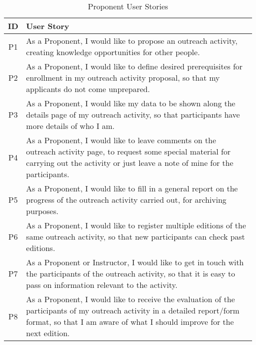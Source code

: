\begin{table}[!htb]
  \centering
  \setlength{\aboverulesep}{0pt}
  \setlength{\belowrulesep}{0pt}
  \caption{Proponent User Stories}
  \label{tab:proponent-user-stories}
  \footnotesize
  \begin{tabularx}{\textwidth}{c|X}
    \toprule
    \rowcolor[rgb]{0.753,0.753,0.753} \textbf{ID} & \textbf{User Story}                    \\
    \hline
    \rowcolor[rgb]{0.898,0.898,0.898} P1          & As a Proponent, I would like to propose an outreach activity, creating knowledge opportunities for other people.                                           \\
    P2                                            & As a Proponent, I would like to define desired prerequisites for enrollment in my outreach activity proposal, so that my applicants do not come unprepared.                                      \\
    \rowcolor[rgb]{0.898,0.898,0.898} P3          & As a Proponent, I would like my data to be shown along the details page of my outreach activity, so that participants have more details of who I am.                                \\
    P4                                            & As a Proponent, I would like to leave comments on the outreach activity page, to request some special material for carrying out the activity or just leave a note of mine for the participants.                              \\
    \rowcolor[rgb]{0.898,0.898,0.898} P5          & As a Proponent, I would like to fill in a general report on the progress of the outreach activity carried out, for archiving purposes.                                \\
    P6                                            & As a Proponent, I would like to register multiple editions of the same outreach activity, so that new participants can check past editions.                              \\
    \rowcolor[rgb]{0.898,0.898,0.898} P7          & As a Proponent or Instructor, I would like to get in touch with the participants of the outreach activity, so that it is easy to pass on information relevant to the activity.                                \\
    P8                                            & As a Proponent, I would like to receive the evaluation of the participants of my outreach activity in a detailed report/form format, so that I am aware of what I should improve for the next edition.                              \\
    \bottomrule
  \end{tabularx}
\end{table}
